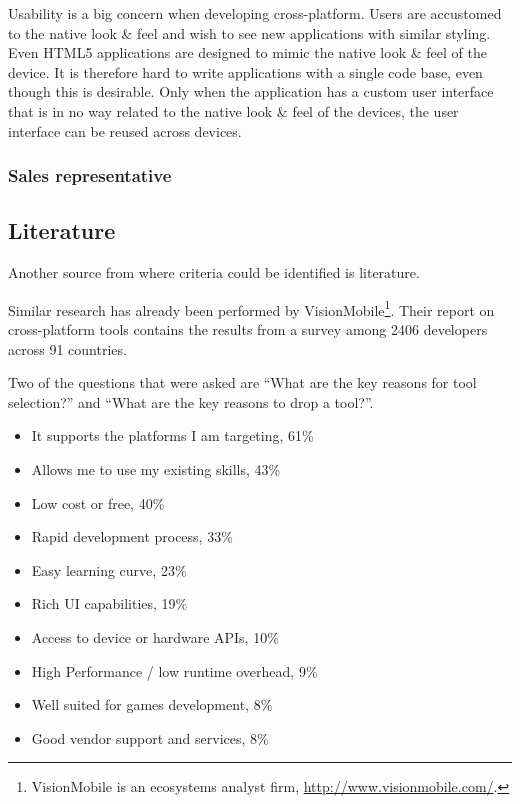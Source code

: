 Usability is a big concern when developing cross-platform. Users are accustomed to the native look \& feel and wish to see new applications with similar styling. Even HTML5 applications are designed to mimic the native look \& feel of the device. It is therefore hard to write applications with a single code base, even though this is desirable. Only when the application has a custom user interface that is in no way related to the native look \& feel of the devices, the user interface can be reused across devices.

\subsubsection{Sales representative}

\TODO{}

\subsection{Literature}

Another source from where criteria could be identified is literature.

Similar research has already been performed by VisionMobile\footnote{VisionMobile is an ecosystems analyst firm, \url{http://www.visionmobile.com/}.}. Their report on cross-platform tools \cite{VMCPT:2012} contains the results from a survey among 2406 developers across 91 countries.

Two of the questions that were asked are ``What are the key reasons for tool selection?'' and ``What are the key reasons to drop a tool?''. 

\begin{itemize}
    \item It supports the platforms I am targeting, 61\%
    \item Allows me to use my existing skills, 43\%
    \item Low cost or free, 40\%
    \item Rapid development process, 33\%
    \item Easy learning curve, 23\%
    \item Rich UI capabilities, 19\%
    \item Access to device or hardware APIs, 10\%
    \item High Performance / low runtime overhead, 9\%
    \item Well suited for games development, 8\%
    \item Good vendor support and services, 8\%
\end{itemize}

